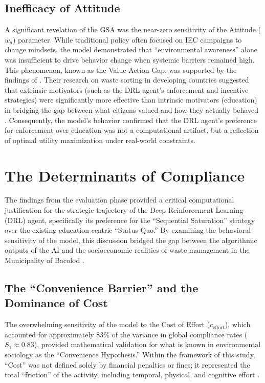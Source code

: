 \subsection{Inefficacy of Attitude}
A significant revelation of the GSA was the near-zero sensitivity of the Attitude ($w_a$) parameter. While traditional policy often focused on IEC campaigns to change mindsets, the model demonstrated that ``environmental awareness'' alone was insufficient to drive behavior change when systemic barriers remained high. This phenomenon, known as the Value-Action Gap, was supported by the findings of \citet{Zhao2022}. Their research on waste sorting in developing countries suggested that extrinsic motivators (such as the DRL agent's enforcement and incentive strategies) were significantly more effective than intrinsic motivators (education) in bridging the gap between what citizens valued and how they actually behaved \citep{Trushna2024}. Consequently, the model's behavior confirmed that the DRL agent’s preference for enforcement over education was not a computational artifact, but a reflection of optimal utility maximization under real-world constraints.

\section{The Determinants of Compliance}
The findings from the evaluation phase provided a critical computational justification for the strategic trajectory of the Deep Reinforcement Learning (DRL) agent, specifically its preference for the ``Sequential Saturation'' strategy over the existing education-centric ``Status Quo.'' By examining the behavioral sensitivity of the model, this discussion bridged the gap between the algorithmic outputs of the AI and the socioeconomic realities of waste management in the Municipality of Bacolod \citep{Jimenez2025}.

\subsection{The ``Convenience Barrier'' and the Dominance of Cost}
The overwhelming sensitivity of the model to the Cost of Effort ($c_{\text{effort}}$), which accounted for approximately 83\% of the variance in global compliance rates ($S_1 \approx 0.83$), provided mathematical validation for what is known in environmental sociology as the ``Convenience Hypothesis.'' Within the framework of this study, ``Cost'' was not defined solely by financial penalties or fines; it represented the total ``friction'' of the activity, including temporal, physical, and cognitive effort \citep{Corcoran2020}. 

